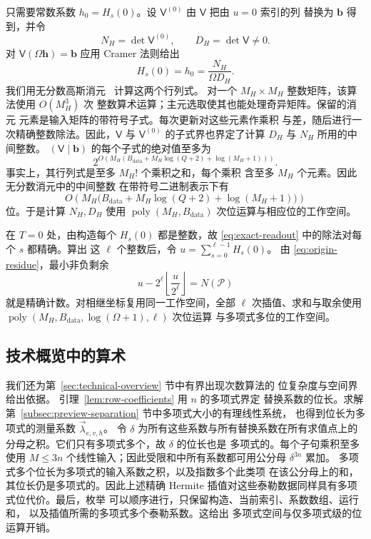 \documentclass[11pt,reqno]{amsart}
\numberwithin{equation}{section}
\theoremstyle{definition}\newtheorem{definition}[theorem]{定义}
\theoremstyle{remark}\newtheorem{remark}[theorem]{注}
\newcommand{\poly}{\operatorname{poly}}
\renewcommand{\le}{\leqslant}
\begin{document}
只需要常数系数 $h_0=H_s(0)$。设
$\mathsf V^{(0)}$ 由 $\mathsf V$ 把由 $u=0$ 索引的列
替换为 $\mathbf b$ 得到，并令
\[
 N_H=\det\mathsf V^{(0)},\qquad D_H=\det\mathsf V\ne0.
\]
对 $\mathsf V(\Omega\mathbf h)=\mathbf b$ 应用 Cramer 法则给出
\begin{equation}\label{eq:exact-readout}
 H_s(0)=h_0=\frac{N_H}{\Omega D_H}.
\end{equation}
我们用无分数高斯消元~\cite[第~I--II 节与第~IV--V 节]{Bareiss68} 计算这两个行列式。
对一个 $M_H\times M_H$ 整数矩阵，该算法使用 $O(M_H^3)$ 次
整数算术运算；主元选取使其也能处理奇异矩阵。保留的消元
元素是输入矩阵的带符号子式。每次更新对这些元素作乘积
与差，随后进行一次精确整数除法。因此，$\mathsf V$ 与
$\mathsf V^{(0)}$ 的子式界也界定了计算 $D_H$ 与 $N_H$
所用的中间整数。
$(\mathsf V\mid\mathbf b)$ 的每个子式的绝对值至多为
\[
 2^{O\left(M_H\left(B_{\mathrm{data}}+
                M_H\log(Q+2)+\log(M_H+1)\right)\right)}.
\]
事实上，其行列式是至多 $M_H!$ 个乘积之和，每个乘积
含至多 $M_H$ 个元素。因此无分数消元中的中间整数
在带符号二进制表示下有
\[
 O\!\left(M_H\bigl(B_{\mathrm{data}}+
                   M_H\log(Q+2)+\log(M_H+1)\bigr)\right)
\]
位。于是计算 $N_H,D_H$ 使用
$\poly(M_H,B_{\mathrm{data}})$ 次位运算与相应位的工作空间。

在 $T=0$ 处，由构造每个 $H_s(0)$ 都是整数，故
\eqref{eq:exact-readout} 中的除法对每个 $s$ 都精确。算出
这 $\ell$ 个整数后，令 $u=\sum_{s=0}^{\ell-1}H_s(0)$。
由 \eqref{eq:origin-residue}，最小非负剩余
\[
 u-2^\ell\left\lfloor\frac{u}{2^\ell}\right\rfloor=N(\mathcal P)
\]
就是精确计数。对相继坐标复用同一工作空间，全部 $\ell$
次插值、求和与取余使用
$\poly(M_H,B_{\mathrm{data}},\log(\Omega+1),\ell)$ 次位运算
与多项式多位的工作空间。

\subsection{技术概览中的算术}
\label{subsec:overview-arithmetic}
我们还为第~\ref{sec:technical-overview} 节中有界出现次数算法的
位复杂度与空间界给出依据。
引理~\ref{lem:row-coefficients} 用 $n$ 的多项式界定
替换系数的位长。求解
第~\ref{subsec:preview-separation} 节中多项式大小的有理线性系统，
也得到位长为多项式的测量系数 $\vec\lambda_{e,v,h}$。
令 $\delta$ 为所有这些系数与所有替换系数在所有求值点上的
分母之积。它们只有多项式多个，故 $\delta$ 的位长也是
多项式的。每个子句乘积至多使用 $M\le3n$
个线性输入；因此受限和中所有系数都可用公分母
$\delta^{3n}$ 累加。
多项式多个位长为多项式的输入系数之积，以及指数多个此类项
在该公分母上的和，其位长仍是多项式的。因此上述精确
Hermite 插值对这些泰勒数据同样具有多项式位代价。最后，枚举
可以顺序进行，只保留构造、当前索引、系数数组、运行和，
以及插值所需的多项式多个泰勒系数。这给出
多项式空间与仅多项式级的位运算开销。
\end{document}
